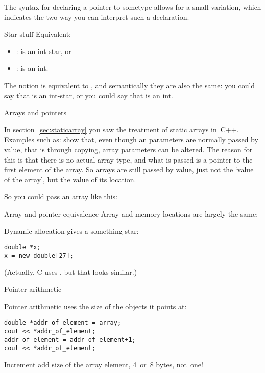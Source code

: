 The syntax for declaring a pointer-to-sometype allows for a small
variation, which indicates the two way you can interpret such a declaration.

\begin{block}{Star stuff}
  \label{sl:starstuff}
  Equivalent:
  \begin{itemize}
  \item {}:  is an int-star, or
  \item {}:  is an int.
  \end{itemize}
\end{block}

The notion  is equivalent to , and
semantically they are also the same: you could say that  is an
int-star, or you could say that  is an int.

 {Arrays and pointers}
\label{sec:arraypointer}

In section~\ref{sec:staticarray} you saw the treatment of static
arrays in~C++. Examples such as:
%
%
show that, even though an parameters are normally passed by value, that is
through copying, array parameters can be altered. The reason for this
is that there is no actual array type, and what is passed is a pointer
to the first element of the array. So arrays are still passed by
value, just not the `value of the array', but the value of its
location.

So you could pass an array like this:
%

\begin{block}{Array and pointer equivalence}
  \label{sl:array-pointer}
  Array and memory locations are largely the same:
\end{block}

\begin{block}{Dynamic allocation}
  \label{sl:newstar}
   gives a something-star:
\begin{verbatim}
double *x;
x = new double[27];
\end{verbatim}
(Actually, C uses , but that looks similar.)
\end{block}

 {Pointer arithmetic}

\begin{block}{Pointer arithmetic}
   uses the size of the objects it
  points at:
\begin{verbatim}
double *addr_of_element = array;
cout << *addr_of_element;
addr_of_element = addr_of_element+1;
cout << *addr_of_element;
\end{verbatim}
Increment add size of the array element, 4~or~8 bytes, not~one!
\end{block}

